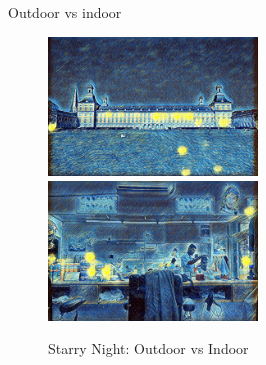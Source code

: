 \documentclass{beamer}
\begin{document}
    \begin{frame}{Outdoor vs indoor}

        \begin{figure}
            \includegraphics[width=0.495\textwidth]{clean}
            \hfill
            \includegraphics[width=0.495\textwidth]{indoor}
            \caption{\label{fig:clutter}Starry Night: Outdoor vs Indoor}
        \end{figure}

    \end{frame}
\end{document}
